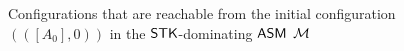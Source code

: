 \begin{example}
\begin{figure}[htbp]
			\caption{Configurations that are reachable from the initial configuration $(([A_0], 0))$ in the $\mathsf{STK}$-dominating $\textsf{ASM}$ ${\mathcal{M} }$}
			\label{stk-asm-example}
		\end{figure}
		
	\end{example}




